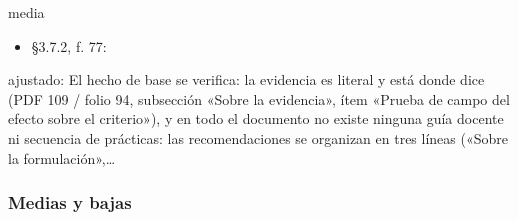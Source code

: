 \begin{ficha}{media}
\begin{itemize}[leftmargin=1.2em,itemsep=1pt,topsep=1pt]
\item {\small §3.7.2, f. 77: }
\end{itemize}
{\footnotesize\color{gris}ajustado: El hecho de base se verifica: la evidencia es literal y está donde dice (PDF 109 /\allowbreak{} folio 94, subsección «Sobre la evidencia», ítem «Prueba de campo del efecto sobre el criterio»), y en todo el documento no existe ninguna guía docente ni secuencia de prácticas: las recomendaciones se organizan en tres líneas («Sobre la formulación»,…\par}
\end{ficha}
\subsubsection*{Medias y bajas}
